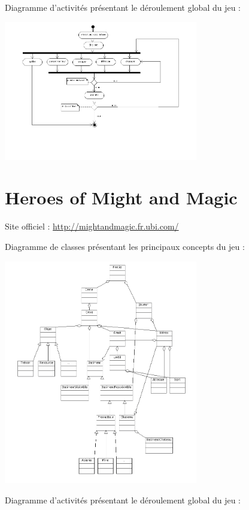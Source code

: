 \documentclass[a4paper,10pt]{report}
\begin{document}
    Diagramme d'activités présentant le déroulement global du jeu : 
    
    \includegraphics[width=320px]{diagrammes/Dofus_ActivityDiagram.png}
    

	\section{Heroes of Might and Magic}
	
    Site officiel : \url{http://mightandmagic.fr.ubi.com/}

    Diagramme de classes présentant les principaux concepts du jeu : 
    
		\includegraphics[width=320px]{diagrammes/heroes_of_might_and_magic.png}

    Diagramme d'activités présentant le déroulement global du jeu : 
    
\end{document}
